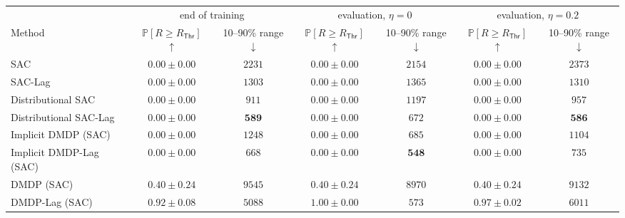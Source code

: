 \begin{tabular*}{\linewidth}{@{\extracolsep{\fill}}lcccccc@{}}
\toprule
 & \multicolumn{2}{c}{end of training} & \multicolumn{2}{c}{evaluation, $\eta=0$} & \multicolumn{2}{c}{evaluation, $\eta=0.2$} \\
\cmidrule(lr){2-3}\cmidrule(lr){4-5}\cmidrule(lr){6-7}
Method & $\mathbb{P}[R\geq R_{\mathsf{Thr}}]$ $\uparrow$ & 10--90\% range $\downarrow$ & $\mathbb{P}[R\geq R_{\mathsf{Thr}}]$ $\uparrow$ & 10--90\% range $\downarrow$ & $\mathbb{P}[R\geq R_{\mathsf{Thr}}]$ $\uparrow$ & 10--90\% range $\downarrow$ \\
\midrule
SAC & $0.00\pm0.00$ & $2231$ & $0.00\pm0.00$ & $2154$ & $0.00\pm0.00$ & $2373$ \\
SAC-Lag & $0.00\pm0.00$ & $1303$ & $0.00\pm0.00$ & $1365$ & $0.00\pm0.00$ & $1310$ \\
Distributional SAC & $0.00\pm0.00$ & $911$ & $0.00\pm0.00$ & $1197$ & $0.00\pm0.00$ & $957$ \\
Distributional SAC-Lag & $0.00\pm0.00$ & $\bm{589}$ & $0.00\pm0.00$ & $672$ & $0.00\pm0.00$ & $\bm{586}$ \\
Implicit DMDP (SAC) & $0.00\pm0.00$ & $1248$ & $0.00\pm0.00$ & $685$ & $0.00\pm0.00$ & $1104$ \\
Implicit DMDP-Lag (SAC) & $0.00\pm0.00$ & $668$ & $0.00\pm0.00$ & $\bm{548}$ & $0.00\pm0.00$ & $735$ \\
DMDP (SAC) & $0.40\pm0.24$ & $9545$ & $0.40\pm0.24$ & $8970$ & $0.40\pm0.24$ & $9132$ \\
DMDP-Lag (SAC) & $\bm{0.92\pm0.08}$ & $5088$ & $\bm{1.00\pm0.00}$ & $573$ & $\bm{0.97\pm0.02}$ & $6011$ \\
\bottomrule
\end{tabular*}
